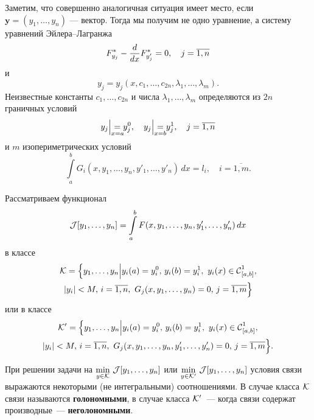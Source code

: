 \begin{enumerateD}
	Заметим, что совершенно аналогичная ситуация имеет место, если $\bm{y}=(y_1,\ldots,y_n)$ --- вектор. Тогда мы получим не одно уравнение, а систему уравнений Эйлера--Лагранжа
	\begin{equation*}
		 F^{\ast}_{y_j}-\frac{d}{dx}F^{\ast}_{y'_j}=0,\quad j=\overline{1,n}
	\end{equation*}
	и
	\begin{equation*}	
		y_j=y_j(x,c_1,\ldots,c_{2n},\lambda_1,\ldots,\lambda_m).
	\end{equation*}
	Неизвестные константы $c_1,\ldots,c_{2n}$ и числа $\lambda_1,\ldots,\lambda_m$ определяются из $2n$ граничных условий
	\begin{equation*}
		 y_j\Big|_{\lefteqn{\scriptstyle x=a}}=y_j^0,\quad y_j\Big|_{\lefteqn{\scriptstyle x=b}}=y_j^1,\quad j=\overline{1,n}
	\end{equation*}
	и $m$ изопериметрических условий
	\begin{equation*}
		 \int\limits_a^b G_i(x,y_1,\ldots,y_n,y'_1,\ldots,y'_n)\,dx=l_i,\quad i=\overline{1,m}.
	\end{equation*}
	\item Рассматриваем функционал 
	\begin{equation*}
		\mathcal{J}[y_1,\ldots,y_n]=\int\limits_a^b F(x,y_1,\ldots,y_n,y'_1,\ldots,y'_n)\,dx
	\end{equation*}
	в классе 
	\begin{multline*}
		\K=\Big\{y_1,\ldots,y_n\Big|y_i(a)=y_i^0,\,y_i(b)=y_i^1,\ y_i(x)\in\Cfn[{[a,b]}]{1},\\ |y_i|<M,\,i=\overline{1,n},\  G_j(x,y_1,\ldots,y_n)=0,\,j=\overline{1,m}\Big\}
	\end{multline*}
	или в классе
	\begin{multline*}
		\K'=\Big\{y_1,\ldots,y_n\Big|y_i(a)=y_i^0,\,y_i(b)=y_i^1,\ y_i(x)\in\Cfn[{[a,b]}]{1},\\ |y_i|<M,\,i=\overline{1,n},\  G_j(x,y_1,\ldots,y_n,y'_1,\ldots,y'_n)=0,\,j=\overline{1,m}\Big\}.
	\end{multline*}
	
	При решении задачи на $\min\limits_{y\in\mathcal{K}}\,\mathcal{J}[y_1,\ldots,y_n]$ или $\min\limits_{y\in\mathcal{K}'}\,\mathcal{J}[y_1,\ldots,y_n]$ условия связи выражаются некоторыми (не интегральными) соотношениями. В случае класса $\mathcal{K}$ связи называются \textbf{голономными}, в случае класса $\mathcal{K}'$~--- когда связи содержат производные~--- \textbf{неголономными}.
	

\end{enumerateD}
